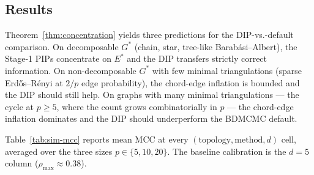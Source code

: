 \subsection{Results}

Theorem~\ref{thm:concentration} yields three predictions for the DIP-vs.-default comparison. On decomposable $G^*$ (chain, star, tree-like Barab\'asi--Albert), the Stage-1 PIPs concentrate on $E^*$ and the DIP transfers strictly correct information. On non-decomposable $G^*$ with few minimal triangulations (sparse Erd\H{o}s--R\'enyi at $2/p$ edge probability), the chord-edge inflation is bounded and the DIP should still help. On graphs with many minimal triangulations --- the cycle at $p \geq 5$, where the count grows combinatorially in $p$ --- the chord-edge inflation dominates and the DIP should underperform the BDMCMC default.

Table~\ref{tab:sim-mcc} reports mean MCC at every $(\text{topology}, \text{method}, d)$ cell, averaged over the three sizes $p \in \{5, 10, 20\}$. The baseline calibration is the $d = 5$ column ($\rho_{\max} \approx 0.38$).
\begin{table}[H]
    \small
    \centering
    \caption{Recovery performance: mean MCC by topology, method, and diagonal strength $d$. The $d = 5$ column is the baseline calibration.}
    \label{tab:sim-mcc}
    
    \\[0.4em]
    \begin{minipage}{0.92\linewidth}
        \footnotesize
    \end{minipage}
\end{table}

